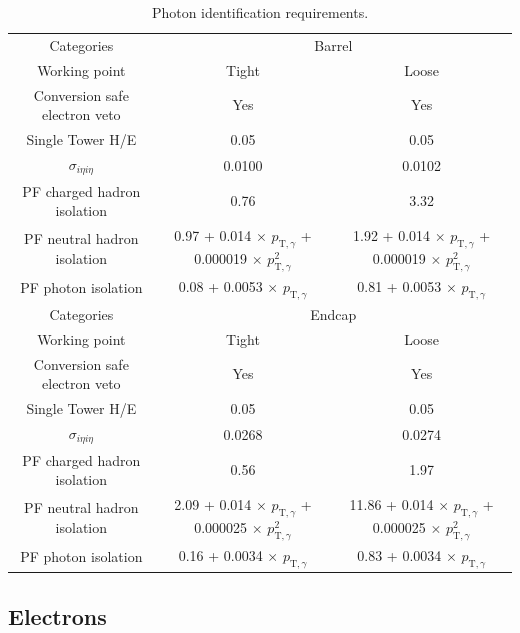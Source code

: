 \begin{table}[ht!]
  \caption{Photon identification requirements.\label{tab:photon-id-gamma}}
  \centering
  \footnotesize
  \begin{tabular}{ ccc }
    \hline
    \hline
    Categories & \multicolumn{2}{c}{Barrel}   \\
    Working point  & Tight & Loose \\
    \hline
    Conversion safe electron veto & Yes & Yes  \\
    Single Tower H/E              & 0.05 & 0.05  \\
    $\sigma_{i\eta i\eta}$        & 0.0100 & 0.0102 \\
    PF charged hadron isolation   & 0.76 & 3.32  \\
    PF neutral hadron isolation   & 0.97 + 0.014 $\times$ $p_{\mathrm{T},\gamma}$ + 0.000019 $\times$ $p_{\mathrm{T},\gamma}^{2}$ & 1.92 + 0.014 $\times$ $p_{\mathrm{T},\gamma}$ + 0.000019 $\times$ $p_{\mathrm{T},\gamma}^{2}$  \\
    PF photon isolation           & 0.08 + 0.0053 $\times$ $p_{\mathrm{T},\gamma}$ & 0.81 + 0.0053 $\times$ $p_{\mathrm{T},\gamma}$ \\
    \hline
    \hline
    Categories & \multicolumn{2}{c}{Endcap}   \\
    Working point  & Tight & Loose \\
    \hline
    Conversion safe electron veto & Yes & Yes  \\
    Single Tower H/E              & 0.05 & 0.05  \\
    $\sigma_{i\eta i\eta}$        & 0.0268 & 0.0274 \\
    PF charged hadron isolation   & 0.56 & 1.97  \\
    PF neutral hadron isolation   & 2.09 + 0.014 $\times$ $p_{\mathrm{T},\gamma}$ + 0.000025 $\times$ $p_{\mathrm{T},\gamma}^{2}$ & 11.86 + 0.014 $\times$ $p_{\mathrm{T},\gamma}$ + 0.000025 $\times$ $p_{\mathrm{T},\gamma}^{2}$ \\
    PF photon isolation           &  0.16 + 0.0034 $\times$ $p_{\mathrm{T},\gamma}$ & 0.83 + 0.0034 $\times$ $p_{\mathrm{T},\gamma}$ \\
    \hline
    \hline
  \end{tabular}
\end{table}

\subsection{Electrons}

